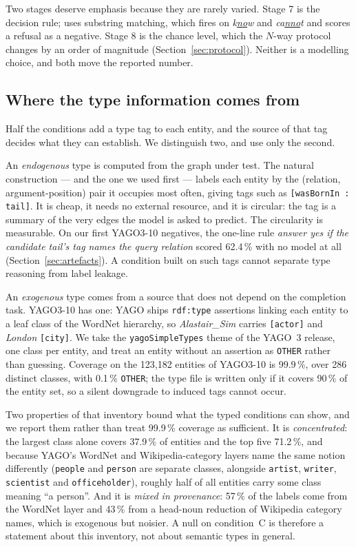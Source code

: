 \documentclass[conference]{IEEEtran}
\begin{document}
Two stages deserve emphasis because they are rarely varied. Stage 7 is the
decision rule; \cite{kgllm} uses substring matching, which fires on
\emph{k\underline{no}w} and \emph{ca\underline{nno}t} and scores a refusal as a
negative. Stage 8 is the chance level, which the $N$-way protocol changes by an
order of magnitude (Section~\ref{sec:protocol}). Neither is a modelling choice,
and both move the reported number.

\subsection{Where the type information comes from}
\label{sec:types}

Half the conditions add a type tag to each entity, and the source of that tag
decides what they can establish. We distinguish two, and use only the second.

An \emph{endogenous} type is computed from the graph under test. The natural
construction --- and the one we used first --- labels each entity by the
(relation, argument-position) pair it occupies most often, giving tags such as
\texttt{[wasBornIn : tail]}. It is cheap, it needs no external resource, and it
is circular: the tag is a summary of the very edges the model is asked to
predict. The circularity is measurable. On our first YAGO3-10 negatives, the
one-line rule \emph{answer yes if the candidate tail's tag names the query
relation} scored 62.4\,\% with no model at all
(Section~\ref{sec:artefacts}). A condition built on such tags cannot separate
type reasoning from label leakage.

An \emph{exogenous} type comes from a source that does not depend on the
completion task. YAGO3-10 has one: YAGO \cite{suchanek2007} ships
\texttt{rdf:type} assertions linking each entity to a leaf class of the WordNet
hierarchy, so
\emph{Alastair\_Sim} carries \texttt{[actor]} and \emph{London}
\texttt{[city]}. We take the \texttt{yagoSimpleTypes} theme of the YAGO~3
release, one class per entity, and treat an entity without an assertion as
\texttt{OTHER} rather than guessing. Coverage on the 123{,}182 entities of
YAGO3-10 is 99.9\,\%, over 286 distinct classes, with 0.1\,\% \texttt{OTHER};
the type file is written only if it covers 90\,\% of the entity set, so a
silent downgrade to induced tags cannot occur.

Two properties of that inventory bound what the typed conditions can show, and
we report them rather than treat 99.9\,\% coverage as sufficient. It is
\emph{concentrated}: the largest class alone covers 37.9\,\% of entities and the
top five 71.2\,\%, and because YAGO's WordNet and Wikipedia-category layers name
the same notion differently (\texttt{people} and \texttt{person} are separate
classes, alongside \texttt{artist}, \texttt{writer}, \texttt{scientist} and
\texttt{officeholder}), roughly half of all entities carry some class meaning
``a person''. And it is \emph{mixed in provenance}: 57\,\% of the labels come
from the WordNet layer and 43\,\% from a head-noun reduction of Wikipedia
category names, which is exogenous but noisier. A null on condition~C is
therefore a statement about this inventory, not about semantic types in general.
\end{document}
